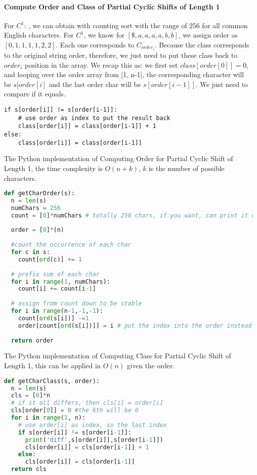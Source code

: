 \documentclass[../main.tex]{subfiles}
\begin{document}
\paragraph{Compute Order and Class of Partial Cyclic Shifts of Length 1} For $C^1$: , we can obtain with counting sort with the range of 256 for all common English characters.  For $C^1$,  we know for $[\$, a, a, a, a, b, b]$, we assign order as $[0, 1, 1, 1, 1, 2, 2]$. Each one corresponds to $C_{order_i}$.  Because the class corresponds to the original string order, therefore, we just need to put these class back to $order_i$ position in the array. We recap this as: we first set $class[order[0]] = 0$, and looping over the order array from [1, n-1], the corresponding character will be $s[order[i]$ and the last order char will be $s[order[i-1]]$.  We just need to compare if it equals.
\begin{lstlisting}[numbers=none]
if s[order[i]] != s[order[i-1]]:
    # use order as index to put the result back
    class[order[i]] = class[order[i-1]] + 1
else:
    class[order[i]] = class[order[i-1]]
\end{lstlisting}

The Python implementation  of Computing Order for Partial Cyclic Shift of Length 1, the time complexity is $O(n+k)$, $k$ is the number of possible characters. 
\begin{lstlisting}[language=Python]
def getCharOrder(s):
  n = len(s)
  numChars = 256
  count = [0]*numChars # totally 256 chars, if you want, can print it out to see these chars
  
  order = [0]*(n)
  
  #count the occurrence of each char
  for c in s:
    count[ord(c)] += 1
    
  # prefix sum of each char
  for i in range(1, numChars):
    count[i] += count[i-1]
    
  # assign from count down to be stable
  for i in range(n-1,-1,-1):
    count[ord(s[i])] -=1
    order[count[ord(s[i])]] = i # put the index into the order instead the suffix string
    
  return order
\end{lstlisting}

The Python implementation  of Computing Class for Partial Cyclic Shift of Length 1, this can be applied in $O(n)$ given the order. 
\begin{lstlisting}[language=Python]
def getCharClass(s, order):
  n = len(s)
  cls = [0]*n
  # if it all differs, then cls[i] = order[i]
  cls[order[0]] = 0 #the 6th will be 0
  for i in range(1, n):
    # use order[i] as index, so the last index
    if s[order[i]] != s[order[i-1]]:
      print('diff',s[order[i]],s[order[i-1]])
      cls[order[i]] = cls[order[i-1]] + 1
    else:
      cls[order[i]] = cls[order[i-1]]
  return cls
\end{lstlisting}
\end{document}
